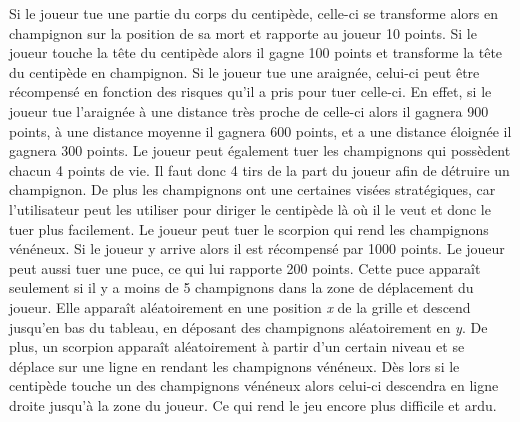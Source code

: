 Si le joueur tue une partie du corps du centipède, celle-ci se transforme alors en champignon sur la position de sa mort et rapporte au joueur 10 points. Si le joueur touche la tête du centipède alors il gagne 100 points et transforme la tête du centipède en champignon. Si le joueur tue une araignée, celui-ci peut être récompensé en fonction des risques qu'il a pris pour tuer celle-ci. En effet, si le joueur tue l'araignée à une distance très proche de celle-ci alors il gagnera 900 points, à une distance moyenne il gagnera 600 points, et a une distance éloignée il gagnera 300 points. Le joueur peut également tuer les champignons qui possèdent chacun 4 points de vie. Il faut donc 4 tirs de la part du joueur afin de détruire un champignon. De plus les champignons ont une certaines visées stratégiques, car l'utilisateur peut les utiliser pour diriger le centipède là où il le veut et donc le tuer plus facilement. Le joueur peut tuer le scorpion qui rend les champignons vénéneux. Si le joueur y arrive alors il est récompensé par 1000 points. Le joueur peut aussi tuer une puce, ce qui lui rapporte 200 points. Cette puce apparaît seulement si il y a moins de 5 champignons dans la zone de déplacement du joueur. Elle apparaît aléatoirement en une position \emph{x} de la grille et  descend jusqu'en bas du tableau, en déposant des champignons aléatoirement en \emph{y}. De plus, un scorpion apparaît aléatoirement à partir d'un certain niveau et se déplace sur une ligne en rendant les champignons vénéneux. Dès lors si le centipède touche un des champignons vénéneux alors celui-ci descendra en ligne droite jusqu'à la zone du joueur. Ce qui rend le jeu encore plus difficile et ardu.
